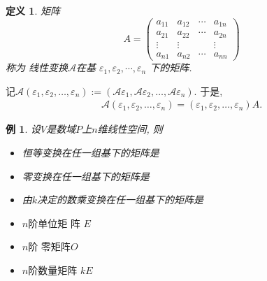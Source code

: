 \documentclass[13pt]{beamer}
\newtheorem{exa}{例}
\newtheorem*{defi}{定义}
\def\A{\mathscr{A}}
\begin{document}
\begin{frame}
\begin{defi}矩阵
	\[
	{A}=\left(\begin{array}{cccc}
	a_{11} & a_{12} & \cdots & a_{1 n} \\
	a_{21} & a_{22} & \cdots & a_{2 n} \\
	\vdots & \vdots & & \vdots \\
	a_{n 1} & a_{n 2} & \cdots & a_{n n}
	\end{array}\right)
	\]
	称为 线性变换$\A$在基 ${\varepsilon}_{1}, {\varepsilon}_{2}, \cdots, {\varepsilon}_{n}$ 下的矩阵.
\end{defi}
记$\A \left(\varepsilon_{1}, \varepsilon_{2}, \dots, \varepsilon_{n}\right):=\left(\A \varepsilon_{1}, \A \varepsilon_{2}, \dots, \A \varepsilon_{n}\right)$. 于是, 
\begin{align}\label{eq-A}
\A  \left(\varepsilon_{1}, \varepsilon_{2}, \dots, \varepsilon_{n}\right)  =\left( \varepsilon_{1}, \varepsilon_{2}, \dots, \varepsilon_{n}\right) A.
\end{align}

\end{frame}


\begin{frame}
\begin{exa}
设$V$是数域$P$上$n$维线性空间, 则
\begin{itemize}
\item 恒等变换在任一组基下的矩阵是\underline{\qquad \qquad}
\item 零变换在任一组基下的矩阵是\underline{\qquad \qquad}
\item 由$k$决定的数乘变换在任一组基下的矩阵是\underline{\qquad \qquad}
\end{itemize}
\pause
\end{exa}
\begin{itemize}
\item $n$阶单位矩 阵 $E$
\item $n$阶 零矩阵${O}$
\item $n$阶数量矩阵 $k E$
\end{itemize}
\end{frame}
\end{document}
